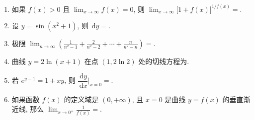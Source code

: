 \documentclass[simple]{hfutexam}
\newcommand{\diff}{\,\mathrm{d}}
\begin{document}
\maketitle

\begin{enumerate}
\item 如果 $f(x)>0$ 且 $\displaystyle\lim_{x\to\infty}f(x)=0$, 则 $\displaystyle\lim_{x\to\infty}\bigl[1+f(x)\bigr]^{1/f(x)}=$\fillblank{3.5cm}{0.5cm}{}.
\item 设 $y=\sin(x^2+1)$, 则 $\diff y=$\fillblank{3.5cm}{0.5cm}{}.
\item 极限 $\displaystyle\lim_{n\to\infty}\left(\frac1{n^2-1}+\frac2{n^2-2}+\cdots+\frac n{n^2-n}\right)=$\fillblank{3.5cm}{0.5cm}{}.
\item 曲线 $y=2\ln(x+1)$ 在点 $(1,2\ln2)$ 处的切线方程为\fillblank{3.5cm}{0.5cm}{}.
\item 若 $e^{y-1}=1+xy$, 则 $\dfrac{\diff y}{\diff x}\bigg|_{x=0}=$\fillblank{3.5cm}{0.5cm}{}.
\item 如果函数 $f(x)$ 的定义域是 $(0,+\infty)$, 且 $x=0$ 是曲线 $y=f(x)$ 的垂直渐近线, 那么 $\displaystyle\lim_{x\to0^+}\frac1{f(x)}=$\fillblank{3.5cm}{0.5cm}{}.
\end{enumerate}
\end{document}
